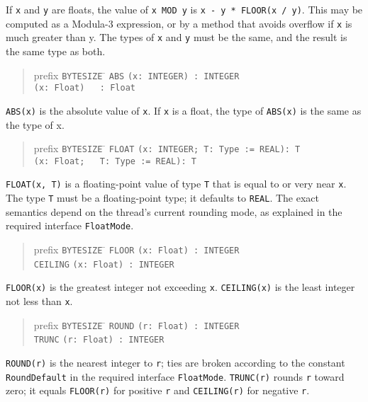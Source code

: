 \documentclass[10pt]{article}
\begin{document}
If \verb|x| and \verb|y| are floats, the value of \verb|x MOD y| is
\verb|x - y * FLOOR(x / y)|.  This may be computed as a Modula-3 expression,
or by a method that avoids overflow if \verb|x| is much greater than y.  The
types of \verb|x| and \verb|y| must be the same, and the result is the same
type as both.

\begin{quote}
  \begin{tabbing}
    prefix \= \verb|BYTESIZE| \= \kill
           \> \verb|ABS|     \> \verb|(x: INTEGER) : INTEGER| \\
           \>                \> \verb|(x: Float)   : Float|
  \end{tabbing}
\end{quote}
\verb|ABS(x)| is the absolute value of \verb|x|.  If \verb|x| is a float, the
type of \verb|ABS(x)| is the same as the type of x.

\begin{quote}
  \begin{tabbing}
    prefix \= \verb|BYTESIZE| \= \kill
           \> \verb|FLOAT|   \> \verb|(x: INTEGER; T: Type := REAL): T| \\
           \>                \> \verb|(x: Float;   T: Type := REAL): T|
  \end{tabbing}
\end{quote}
\verb|FLOAT(x, T)| is a floating-point value of type \verb|T| that is equal to
or very near \verb|x|.  The type \verb|T| must be a floating-point type; it
defaults to \verb|REAL|.  The exact semantics depend on the thread's current
rounding mode, as explained in the required interface \verb|FloatMode|.

\begin{quote}
  \begin{tabbing}
    prefix \= \verb|BYTESIZE| \= \kill
           \> \verb|FLOOR|   \> \verb|(x: Float) : INTEGER| \\
           \> \verb|CEILING| \> \verb|(x: Float) : INTEGER|
  \end{tabbing}
\end{quote}
\verb|FLOOR(x)| is the greatest integer not exceeding \verb|x|.
\verb|CEILING(x)| is the least integer not less than \verb|x|.

\begin{quote}
  \begin{tabbing}
    prefix \= \verb|BYTESIZE| \= \kill
           \> \verb|ROUND|   \> \verb|(r: Float) : INTEGER| \\
           \> \verb|TRUNC|   \> \verb|(r: Float) : INTEGER|
  \end{tabbing}
\end{quote}
\verb|ROUND(r)| is the nearest integer to \verb|r|; ties are broken according
to the constant \verb|RoundDefault| in the required interface
\verb|FloatMode|.  \verb|TRUNC(r)| rounds \verb|r| toward zero; it equals
\verb|FLOOR(r)| for positive \verb|r| and \verb|CEILING(r)| for negative
\verb|r|.
\end{document}
